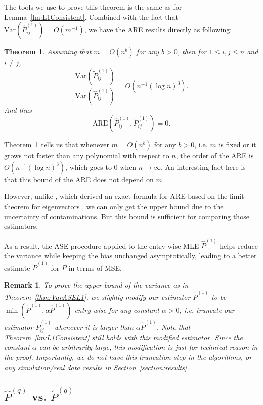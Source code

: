 \documentclass[a4paper]{article}
\newtheorem{theorem}[fact]{Theorem}
\newtheorem{remark}[fact]{Remark}
\renewcommand{\hat}{\widehat}
\begin{document}
The tools we use to prove this theorem is the same as for Lemma~\ref{lm:L1Consistent}. Combined with the fact that $\mathrm{Var}(\hat{P}_{ij}^{(1)}) = O(m^{-1})$, we have the ARE results directly as following:
\begin{theorem}
\label{thm:AREL1}
Assuming that $m = O(n^b)$ for any $b > 0$,  then for $1 \le i, j \le n$ and $i \ne j$,
\[
	\frac{\mathrm{Var}(\widetilde{P}_{ij}^{(1)})}{\mathrm{Var}(\hat{P}_{ij}^{(1)})}
    = O(n^{-1} (\log n)^3).
\]
And thus
\[
	\mathrm{ARE}(\hat{P}_{ij}^{(1)}, \widetilde{P}_{ij}^{(1)}) = 0.
\]
\end{theorem}

Theorem~\ref{thm:AREL1} tells us that whenever $m = O(n^b)$ for any $b > 0$, i.e. $m$ is fixed or it grows not faster than any polynomial with respect to $n$, the order of the ARE is $O(n^{-1} (\log n)^3)$, which goes to 0 when $n \to \infty$. An interesting fact here is that this bound of the ARE does not depend on $m$.

However, unlike \citep{tang2016law}, which derived an exact formula for ARE based on the limit theorem for eigenvectors \citep{athreya2016limit}, we can only get the upper bound due to the uncertainty of contaminations. But this bound is sufficient for comparing those estimators.

As a result, the ASE procedure applied to the entry-wise MLE $\hat{P}^{(1)}$ helps reduce the variance while keeping the bias unchanged asymptotically, leading to a better estimate $\widetilde{P}^{(1)}$ for $P$ in terms of MSE.

\begin{remark}
\label{remark:var1}
To prove the upper bound of the variance as in Theorem~\ref{thm:VarASEL1}, we slightly modify our estimator $\widetilde{P}^{(1)}$ to be $\min(\widetilde{P}^{(1)}, \alpha \hat{P}^{(1)})$ entry-wise for any constant $\alpha > 0$, i.e. truncate our estimator $\widetilde{P}^{(1)}_{ij}$ whenever it is larger than $\alpha \hat{P}^{(1)}$. Note that Theorem~\ref{lm:L1Consistent} still holds with this modified estimator. Since the constant $\alpha$ can be arbitrarily large, this modification is just for technical reason in the proof. Importantly, we do not have this truncation step in the algorithms, or any simulation/real data results in Section~\ref{section:results}.
\end{remark}


\subsection{$\hat{P}^{(q)}$ vs. $\widetilde{P}^{(q)}$}
\end{document}
